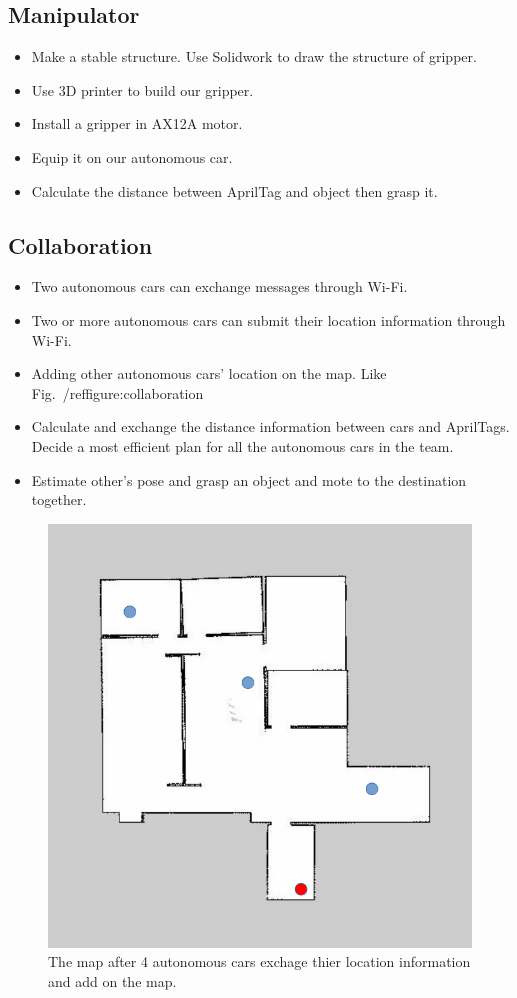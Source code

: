 \documentclass[a4paper, 10pt, conference]{ieeeconf}      %
\begin{document}
\subsection{Manipulator}
\begin{itemize}
	\item Make a stable structure. Use Solidwork to draw the structure of gripper.
	\item Use 3D printer to build our gripper.
	\item Install a gripper in AX12A motor.
	\item Equip it on our autonomous car.
	\item Calculate the distance between AprilTag and object then grasp it.
\end{itemize}



\subsection{Collaboration}
\begin{itemize}
	\item Two autonomous cars can exchange messages through Wi-Fi.
	\item Two or more autonomous cars can submit their location information through Wi-Fi.
	\item Adding other autonomous cars’ location on the map. Like Fig.~/ref{figure:collaboration}
	\item Calculate and exchange the distance information between cars and AprilTags. Decide a most efficient plan for all the autonomous cars in the team.
	\item Estimate other’s pose and grasp an object and mote to the destination together.
\end{itemize}

\begin{figure}[h]
\includegraphics[width=0.95\columnwidth]{collaboration}
\centering
\caption{The map after 4 autonomous cars exchage thier location information and add on the map.}
\end{figure}
\end{document}
